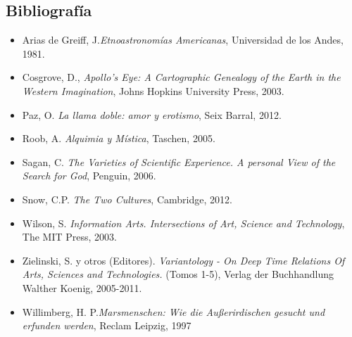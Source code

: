 \documentclass{report}
\begin{document}
\subsection*{Bibliograf\'ia}

\begin{itemize}

\item Arias de Greiff, J.\emph{Etnoastronom\'ias Americanas},
  Universidad de los Andes, 1981.

\item Cosgrove, D., \emph{Apollo's Eye: A Cartographic Genealogy of
  the Earth in the Western Imagination}, Johns Hopkins University
  Press, 2003.
\item Paz, O. \emph{La llama doble: amor y erotismo}, Seix Barral, 2012.
\item Roob, A. \emph{Alquimia y M\'istica}, Taschen, 2005.
\item Sagan, C. \emph{The Varieties of Scientific Experience. A personal View of the Search for God}, Penguin, 2006.
\item Snow, C.P. \emph{The Two Cultures}, Cambridge, 2012.
\item Wilson, S. \emph{Information Arts. Intersections of Art, Science
and Technology}, The MIT Press, 2003.
\item Zielinski, S. y otros (Editores). \emph{Variantology - On Deep Time
  Relations Of Arts, Sciences and Technologies.} (Tomos 1-5), Verlag
der Buchhandlung Walther Koenig, 2005-2011.

\item Willimberg, H. P.\emph{Marsmenschen:  Wie die Au\ss erirdischen
  gesucht und erfunden werden}, Reclam Leipzig, 1997

\end{itemize}
\end{document}
